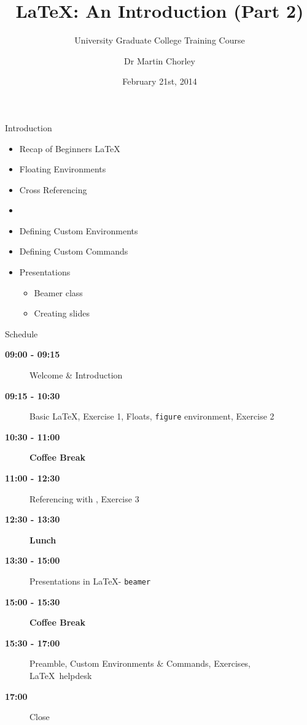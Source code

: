 \documentclass[mathserif]{beamer}
\title{\LaTeX: An Introduction (Part 2)}
\subtitle{University Graduate College Training Course}
\author[Martin Chorley]{Dr Martin Chorley}
\institute[COMSC]{School of Computer Science \& Informatics, Cardiff University}
\date[21/02/14]{February 21st, 2014}
\begin{document}
\begin{frame}[plain]
	\titlepage
\end{frame}
	

\begin{frame}{Introduction}

\vfill
\begin{itemize}
	\item Recap of Beginners \LaTeX
	\item Floating Environments
	\item Cross Referencing
	\item \BibTeX
	\item Defining Custom Environments
	\item Defining Custom Commands
	\item Presentations
		\begin{itemize}
			\item Beamer class
			\item Creating slides
		\end{itemize}	
\end{itemize}
\vfill
\end{frame}


\begin{frame}{Schedule}
\vfill
	\begin{description}
		\item[\textbf{09:00 - 09:15}] Welcome \& Introduction
		\item[\textbf{09:15 - 10:30}] Basic \LaTeX, Exercise 1, Floats, \texttt{figure} environment, Exercise 2
		\item[\textbf{10:30 - 11:00}] \textbf{Coffee Break}
		\item[\textbf{11:00 - 12:30}] Referencing with \BibTeX, Exercise 3
		\item[\textbf{12:30 - 13:30}] \textbf{Lunch}
		\item[\textbf{13:30 - 15:00}] Presentations in \LaTeX - \texttt{beamer}
		\item[\textbf{15:00 - 15:30}] \textbf{Coffee Break}
		\item[\textbf{15:30 - 17:00}] Preamble, Custom Environments \& Commands, Exercises, \LaTeX\ helpdesk
		\item[\textbf{17:00}] Close
	\end{description}
\vfill
\end{frame}
\end{document}
